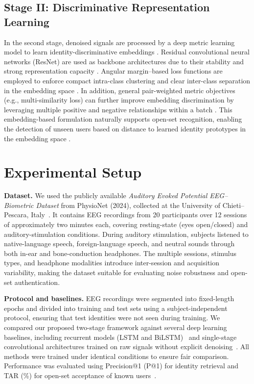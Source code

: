 \documentclass[a4paper,conference]{IEEEtran}
\begin{document}
	\subsection{Stage II: Discriminative Representation Learning}
	In the second stage, denoised signals are processed by a deep metric learning model to learn identity-discriminative embeddings \cite{Hadsell2006,Schroff2015}. Residual convolutional neural networks (ResNet) are used as backbone architectures due to their stability and strong representation capacity \cite{He2016}. Angular margin--based loss functions are employed to enforce compact intra-class clustering and clear inter-class separation in the embedding space \cite{Deng2019}. In addition, general pair-weighted metric objectives (e.g., multi-similarity loss) can further improve embedding discrimination by leveraging multiple positive and negative relationships within a batch \cite{Wang2019}. This embedding-based formulation naturally supports open-set recognition, enabling the detection of unseen users based on distance to learned identity prototypes in the embedding space \cite{Hadsell2006,Schroff2015}.
	\section{Experimental Setup}
	\textbf{Dataset.} We used the publicly available \emph{Auditory Evoked Potential EEG--Biometric Dataset} from PhysioNet (2024), collected at the University of Chieti--Pescara, Italy~\cite{Alzahab2024}. It contains EEG recordings from 20 participants over 12 sessions of approximately two minutes each, covering resting-state (eyes open/closed) and auditory-stimulation conditions. During auditory stimulation, subjects listened to native-language speech, foreign-language speech, and neutral sounds through both in-ear and bone-conduction headphones. The multiple sessions, stimulus types, and headphone modalities introduce inter-session and acquisition variability, making the dataset suitable for evaluating noise robustness and open-set authentication.
	
	\textbf{Protocol and baselines.} EEG recordings were segmented into fixed-length epochs and divided into training and test sets using a subject-independent protocol, ensuring that test identities were not seen during training. We compared our proposed two-stage framework against several deep learning baselines, including recurrent models (LSTM and BiLSTM)~\cite{Hochreiter1997, Graves2005} and single-stage convolutional architectures trained on raw signals without explicit denoising~\cite{Zhang2017, Fallahi2023, Yang2022}. All methods were trained under identical conditions to ensure fair comparison. Performance was evaluated using Precision@1 (P@1) for identity retrieval and TAR (\%) for open-set acceptance of known users~\cite{Hadsell2006, Schroff2015}.
	
\end{document}
